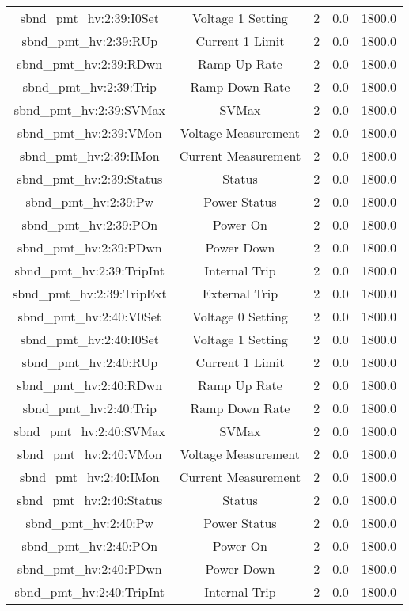 \begin{table}[ptb]
\begin{tabular}{c | c c c c}
sbnd_pmt_hv:2:39:I0Set & Voltage 1 Setting & 2 & 0.0 & 1800.0\\ 
sbnd_pmt_hv:2:39:RUp & Current 1 Limit & 2 & 0.0 & 1800.0\\ 
sbnd_pmt_hv:2:39:RDwn & Ramp Up Rate & 2 & 0.0 & 1800.0\\ 
sbnd_pmt_hv:2:39:Trip & Ramp Down Rate & 2 & 0.0 & 1800.0\\ 
sbnd_pmt_hv:2:39:SVMax & SVMax & 2 & 0.0 & 1800.0\\ 
sbnd_pmt_hv:2:39:VMon & Voltage Measurement & 2 & 0.0 & 1800.0\\ 
sbnd_pmt_hv:2:39:IMon & Current Measurement & 2 & 0.0 & 1800.0\\ 
sbnd_pmt_hv:2:39:Status & Status & 2 & 0.0 & 1800.0\\ 
sbnd_pmt_hv:2:39:Pw & Power Status & 2 & 0.0 & 1800.0\\ 
sbnd_pmt_hv:2:39:POn & Power On & 2 & 0.0 & 1800.0\\ 
sbnd_pmt_hv:2:39:PDwn & Power Down & 2 & 0.0 & 1800.0\\ 
sbnd_pmt_hv:2:39:TripInt & Internal Trip & 2 & 0.0 & 1800.0\\ 
sbnd_pmt_hv:2:39:TripExt & External Trip & 2 & 0.0 & 1800.0\\ 
sbnd_pmt_hv:2:40:V0Set & Voltage 0 Setting & 2 & 0.0 & 1800.0\\ 
sbnd_pmt_hv:2:40:I0Set & Voltage 1 Setting & 2 & 0.0 & 1800.0\\ 
sbnd_pmt_hv:2:40:RUp & Current 1 Limit & 2 & 0.0 & 1800.0\\ 
sbnd_pmt_hv:2:40:RDwn & Ramp Up Rate & 2 & 0.0 & 1800.0\\ 
sbnd_pmt_hv:2:40:Trip & Ramp Down Rate & 2 & 0.0 & 1800.0\\ 
sbnd_pmt_hv:2:40:SVMax & SVMax & 2 & 0.0 & 1800.0\\ 
sbnd_pmt_hv:2:40:VMon & Voltage Measurement & 2 & 0.0 & 1800.0\\ 
sbnd_pmt_hv:2:40:IMon & Current Measurement & 2 & 0.0 & 1800.0\\ 
sbnd_pmt_hv:2:40:Status & Status & 2 & 0.0 & 1800.0\\ 
sbnd_pmt_hv:2:40:Pw & Power Status & 2 & 0.0 & 1800.0\\ 
sbnd_pmt_hv:2:40:POn & Power On & 2 & 0.0 & 1800.0\\ 
sbnd_pmt_hv:2:40:PDwn & Power Down & 2 & 0.0 & 1800.0\\ 
sbnd_pmt_hv:2:40:TripInt & Internal Trip & 2 & 0.0 & 1800.0\\ 

\end{tabular}
\end{table}
